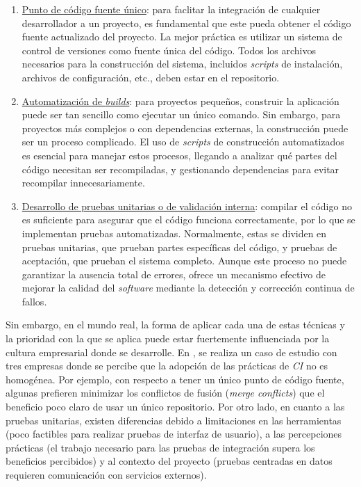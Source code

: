 \begin{enumerate}
      \item \underline{Punto de código fuente único}: para faclitar la integración de cualquier
      desarrollador a un proyecto, es fundamental que este pueda obtener el código fuente
      actualizado del proyecto. La mejor práctica es utilizar un sistema de control de versiones
      como fuente única del código. Todos los archivos necesarios para la construcción del sistema,
      incluidos \textit{scripts} de instalación, archivos de configuración, etc., deben estar
      en el repositorio.
      \item \underline{Automatización de \textit{builds}}: para proyectos pequeños, construir la
      aplicación puede ser tan sencillo como ejecutar un único comando. Sin embargo, para proyectos
      más complejos o con dependencias externas, la construcción puede ser un proceso complicado.
      El uso de \textit{scripts} de construcción automatizados es esencial para manejar estos
      procesos, llegando a analizar qué partes del código necesitan ser recompiladas, y gestionando
      dependencias para evitar recompilar innecesariamente.
      \item \underline{Desarrollo de pruebas unitarias o de validación interna}: compilar el código
      no es suficiente para asegurar que el código funciona correctamente, por lo que se
      implementan pruebas automatizadas. Normalmente, estas se dividen en pruebas unitarias, que
      prueban partes específicas del código, y pruebas de aceptación, que prueban el sistema
      completo. Aunque este proceso no puede garantizar la ausencia total de errores, ofrece un
      mecanismo efectivo de mejorar la calidad del \textit{software} mediante la detección y
      corrección continua de fallos.
\end{enumerate}

Sin embargo, en el mundo real, la forma de aplicar cada una de estas técnicas y la prioridad con
la que se aplica puede estar fuertemente influenciada por la cultura empresarial donde
se desarrolle. En \cite{8}, se realiza un caso de estudio con tres empresas donde se percibe
que la adopción de las prácticas de \textit{CI} no es homogénea. Por ejemplo, con respecto a tener
un único punto de código fuente, algunas prefieren minimizar los conflictos de fusión
(\textit{merge conflicts}) que el beneficio poco claro de usar un único repositorio. Por otro
lado, en cuanto a las pruebas unitarias, existen diferencias debido a limitaciones en las
herramientas (poco factibles para realizar pruebas de interfaz de usuario), a las percepciones
prácticas (el trabajo necesario para las pruebas de integración supera los beneficios percibidos)
y al contexto del proyecto (pruebas centradas en datos requieren comunicación con servicios
externos).\\

